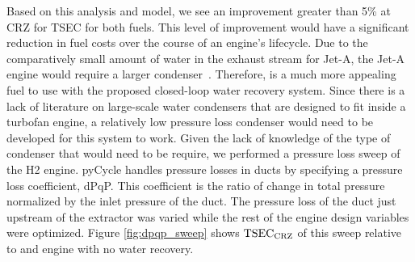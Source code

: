 \documentclass[conf]{new-aiaa}
\begin{document}
Based on this analysis and model, we see an improvement greater than 5\% at CRZ for TSEC for both fuels.
This level of improvement would have a significant reduction in fuel costs over the course of an engine's lifecycle.
Due to the comparatively small amount of water in the exhaust stream for Jet-A, the Jet-A engine would require a larger condenser~\cite{Strom2002}.
Therefore,  is a much more appealing fuel to use with the proposed closed-loop water recovery system.
Since there is a lack of literature on large-scale water condensers that are designed to fit inside a turbofan engine, a relatively low pressure loss condenser would need to be developed for this system to work.
Given the lack of knowledge of the type of condenser that would need to be require, we performed a pressure loss sweep of the H2 engine.
pyCycle handles pressure losses in ducts by specifying a pressure loss coefficient, dPqP.
This coefficient is the ratio of change in total pressure normalized by the inlet pressure of the duct.
The pressure loss of the duct just upstream of the extractor was varied while the rest of the engine design variables were optimized.
Figure \ref{fig:dpqp_sweep} shows $\rm{TSEC}_{\rm{CRZ}}$ of this sweep relative to and engine with no water recovery.
\end{document}

